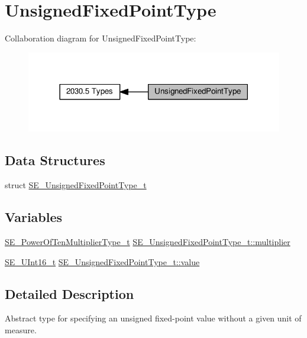 \hypertarget{group__UnsignedFixedPointType}{}\section{Unsigned\+Fixed\+Point\+Type}
\label{group__UnsignedFixedPointType}
Collaboration diagram for Unsigned\+Fixed\+Point\+Type\+:\nopagebreak
\begin{figure}[H]
\begin{center}
\leavevmode
\includegraphics[width=318pt]{group__UnsignedFixedPointType}
\end{center}
\end{figure}
\subsection*{Data Structures}
\begin{DoxyCompactItemize}
\item 
struct \hyperlink{structSE__UnsignedFixedPointType__t}{S\+E\+\_\+\+Unsigned\+Fixed\+Point\+Type\+\_\+t}
\end{DoxyCompactItemize}
\subsection*{Variables}
\begin{DoxyCompactItemize}
\item 
\hyperlink{group__PowerOfTenMultiplierType_gaf0317b781dc8dbb9cb6ac4e44a14fdef}{S\+E\+\_\+\+Power\+Of\+Ten\+Multiplier\+Type\+\_\+t} \hyperlink{group__UnsignedFixedPointType_ga944fd386e2f8f539834109e13291e1c6}{S\+E\+\_\+\+Unsigned\+Fixed\+Point\+Type\+\_\+t\+::multiplier}
\item 
\hyperlink{group__UInt16_gac68d541f189538bfd30cfaa712d20d29}{S\+E\+\_\+\+U\+Int16\+\_\+t} \hyperlink{group__UnsignedFixedPointType_ga47b5a512b23a9b27559acfa77b0f2881}{S\+E\+\_\+\+Unsigned\+Fixed\+Point\+Type\+\_\+t\+::value}
\end{DoxyCompactItemize}


\subsection{Detailed Description}
Abstract type for specifying an unsigned fixed-\/point value without a given unit of measure. 

